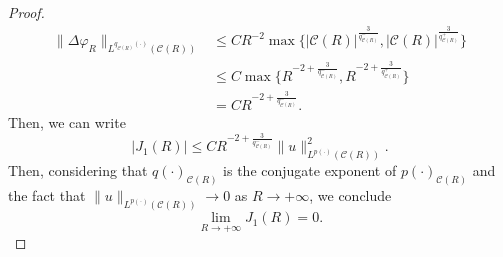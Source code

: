 \documentclass[a4paper,12pt]{amsart}
\theoremstyle{definition}
\theoremstyle{plain}
\renewcommand{\phi}{\varphi}
\let\phi\varphi
\def\vu{ u }
\begin{document}
\begin{proof}
\begin{align}\label{EstimationC01_92_exterior_bola}
\|\Delta \phi_R \|_{L^{q_{\mathcal{C}( R)  }(\cdot)}(\mathcal{C}( R)  )}&\leq
 C R^{-2}\max \{|\mathcal{C}( R)  |^{\frac 3 {q_{\mathcal{C}( R)  }^- }}, |\mathcal{C}( R)  |^{\frac 3 {q_{\mathcal{C}( R)  }^+}}\}
 \\ & \leq
  C\max \{R^{-2+\frac 3{q_{\mathcal{C}( R)  }^-}}, R^{-2+\frac 3 {q_{\mathcal{C}( R)  }^+}}\}
\\ & =
  C R^{-2+\frac 3{q_{\mathcal{C}( R)  }^-}} 
 .
\end{align}
Then, we can write
\begin{equation}\label{estimateI1_92_exterior_bola}
|J_1(R)|\leq 
  C R^{-2+\frac 3{q_{\mathcal{C}( R)  }^-}} 
\|\vu\|_{L^{p(\cdot)}( \mathcal{C}( R)  )}^2.
\end{equation}
Then,  considering that $q(\cdot)_{\mathcal{C}( R)  }$ is the conjugate exponent of $p(\cdot)_{\mathcal{C}( R)  }$  and the fact that $\|\vu\|_{L^{p(\cdot)}( \mathcal{C}( R)   )}\to 0$ as  $R\to +\infty$, we conclude 
$$
\lim_{R\to +\infty} J_1(R)  =  0. 
$$


\end{proof}
\end{document}
